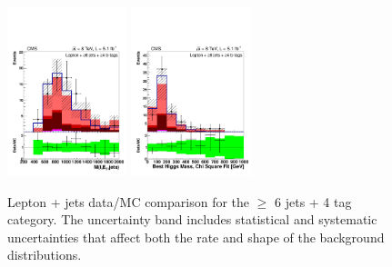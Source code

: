 \begin{figure}[hbtp]
\begin{center}
   \includegraphics[width=0.31\textwidth]{Figures/Analysis_1_Diagrams/d2MCPlots_dijet_mass_of_everything_cut9_jge6_tge4_Combined_HtWgt.pdf}
   \includegraphics[width=0.31\textwidth]{Figures/Analysis_1_Diagrams/d2MCPlots_best_higgs_mass_cut9_jge6_tge4_Combined_HtWgt.pdf}
   \hspace{0.055\textwidth}
   \caption{Lepton + jets data/MC comparison for the $\ge$ 6 jets + 4 tag category.  The uncertainty band includes statistical and systematic uncertainties that affect both the rate and shape of the background distributions.}
   \label{fig:lj_input_6j_4t_part2}
 \end{center}
\end{figure}


